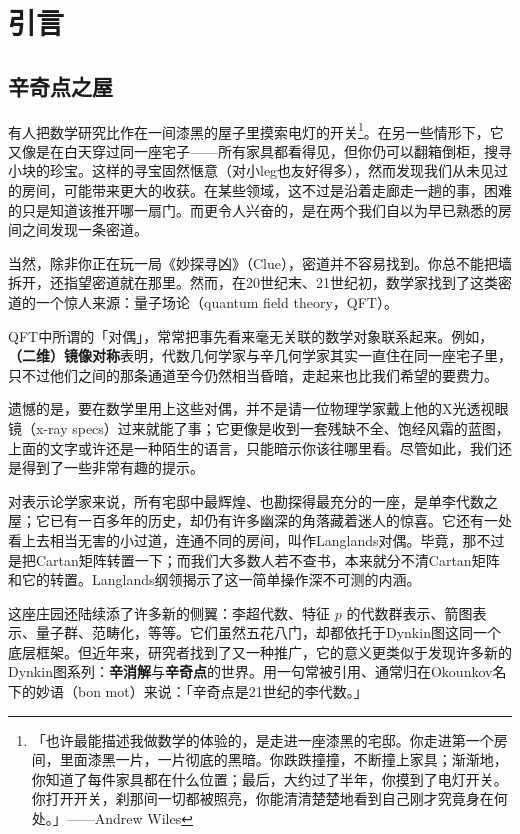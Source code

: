 \section{引言}

\subsection{辛奇点之屋}
\label{sec:house}

有人把数学研究比作在一间漆黑的屋子里摸索电灯的开关\footnote{「也许最能描述我做数学的体验的，是走进一座漆黑的宅邸。你走进第一个房间，里面漆黑一片，一片彻底的黑暗。你跌跌撞撞，不断撞上家具；渐渐地，你知道了每件家具都在什么位置；最后，大约过了半年，你摸到了电灯开关。你打开开关，刹那间一切都被照亮，你能清清楚楚地看到自己刚才究竟身在何处。」——Andrew Wiles}。在另一些情形下，它又像是在白天穿过同一座宅子——所有家具都看得见，但你仍可以翻箱倒柜，搜寻小块的珍宝。这样的寻宝固然惬意（对小leg也友好得多），然而发现我们从未见过的房间，可能带来更大的收获。在某些领域，这不过是沿着走廊走一趟的事，困难的只是知道该推开哪一扇门。而更令人兴奋的，是在两个我们自以为早已熟悉的房间之间发现一条密道。

当然，除非你正在玩一局《妙探寻凶》（Clue），密道并不容易找到。你总不能把墙拆开，还指望密道就在那里。然而，在20世纪末、21世纪初，数学家找到了这类密道的一个惊人来源：量子场论（quantum field theory，QFT）。

QFT中所谓的「对偶」，常常把事先看来毫无关联的数学对象联系起来。例如，\textbf{（二维）镜像对称}表明，代数几何学家与辛几何学家其实一直住在同一座宅子里，只不过他们之间的那条通道至今仍然相当昏暗，走起来也比我们希望的要费力。

遗憾的是，要在数学里用上这些对偶，并不是请一位物理学家戴上他的X光透视眼镜（x-ray specs）过来就能了事；它更像是收到一套残缺不全、饱经风霜的蓝图，上面的文字或许还是一种陌生的语言，只能暗示你该往哪里看。尽管如此，我们还是得到了一些非常有趣的提示。

对表示论学家来说，所有宅邸中最辉煌、也勘探得最充分的一座，是单李代数之屋；它已有一百多年的历史，却仍有许多幽深的角落藏着迷人的惊喜。它还有一处看上去相当无害的小过道，连通不同的房间，叫作Langlands对偶。毕竟，那不过是把Cartan矩阵转置一下；而我们大多数人若不查书，本来就分不清Cartan矩阵和它的转置。Langlands纲领揭示了这一简单操作深不可测的内涵。

这座庄园还陆续添了许多新的侧翼：李超代数、特征 $p$ 的代数群表示、箭图表示、量子群、范畴化，等等。它们虽然五花八门，却都依托于Dynkin图这同一个底层框架。但近年来，研究者找到了又一种推广，它的意义更类似于发现许多新的Dynkin图系列：\textbf{辛消解}与\textbf{辛奇点}的世界。用一句常被引用、通常归在Okounkov名下的妙语（bon mot）来说：「辛奇点是21世纪的李代数。」


